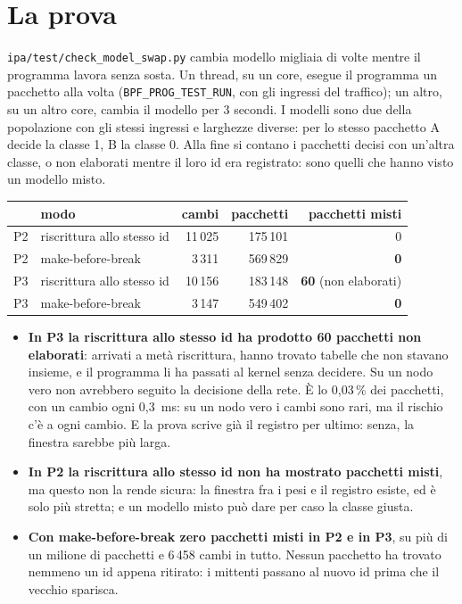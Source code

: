 \documentclass[11pt,a4paper,oneside]{report}
\begin{document}
\section{La prova}

\texttt{ipa/test/check\_model\_swap.py} cambia modello migliaia di volte mentre il
programma lavora senza sosta. Un thread, su un core, esegue il programma un
pacchetto alla volta (\texttt{BPF\_PROG\_TEST\_RUN}, con gli ingressi del
traffico); un altro, su un altro core, cambia il modello per 3 secondi. I modelli
sono due della popolazione con gli stessi ingressi e larghezze diverse: per lo
stesso pacchetto A decide la classe 1, B la classe 0. Alla fine si contano i
pacchetti decisi con un'altra classe, o non elaborati mentre il loro id era
registrato: sono quelli che hanno visto un modello misto.

\begin{center}
\small
\begin{tabular}{@{}llrrr@{}}
\toprule
& \textbf{modo} & \textbf{cambi} & \textbf{pacchetti} & \textbf{pacchetti misti} \\
\midrule
P2 & riscrittura allo stesso id & 11\,025 & 175\,101 & 0 \\
P2 & make-before-break & 3\,311 & 569\,829 & \textbf{0} \\
\addlinespace
P3 & riscrittura allo stesso id & 10\,156 & 183\,148 & \textbf{60} (non elaborati) \\
P3 & make-before-break & 3\,147 & 549\,402 & \textbf{0} \\
\bottomrule
\end{tabular}
\end{center}

\begin{itemize}
  \item \textbf{In P3 la riscrittura allo stesso id ha prodotto 60 pacchetti non
        elaborati}: arrivati a metà riscrittura, hanno trovato tabelle che non
        stavano insieme, e il programma li ha passati al kernel senza decidere.
        Su un nodo vero non avrebbero seguito la decisione della rete. È lo
        0,03\,\% dei pacchetti, con un cambio ogni 0,3~ms: su un nodo vero i cambi
        sono rari, ma il rischio c'è a ogni cambio. E la prova scrive già il
        registro per ultimo: senza, la finestra sarebbe più larga.
  \item \textbf{In P2 la riscrittura allo stesso id non ha mostrato pacchetti
        misti}, ma questo non la rende sicura: la finestra fra i pesi e il
        registro esiste, ed è solo più stretta; e un modello misto può dare per
        caso la classe giusta.
  \item \textbf{Con make-before-break zero pacchetti misti in P2 e in P3}, su più
        di un milione di pacchetti e 6\,458 cambi in tutto. Nessun pacchetto ha
        trovato nemmeno un id appena ritirato: i mittenti passano al nuovo id
        prima che il vecchio sparisca.
\end{itemize}
\end{document}
